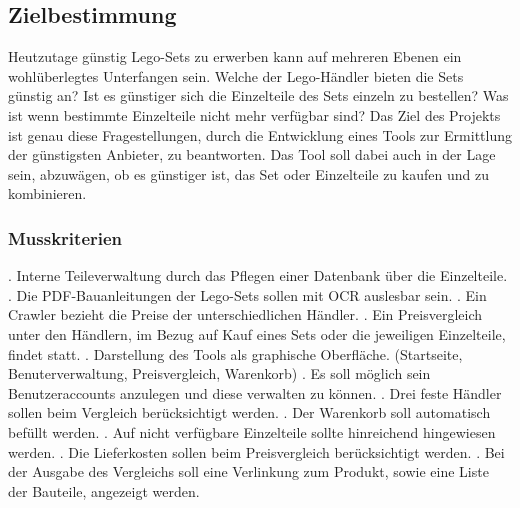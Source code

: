 \subsection{Zielbestimmung}

Heutzutage günstig Lego-Sets zu erwerben kann auf mehreren Ebenen ein wohlüberlegtes Unterfangen sein. Welche der Lego-Händler bieten die Sets günstig an? Ist es günstiger sich die Einzelteile des Sets einzeln zu bestellen? Was ist wenn bestimmte Einzelteile nicht mehr verfügbar sind? \newline
Das Ziel des Projekts ist genau diese Fragestellungen, durch die Entwicklung eines Tools zur Ermittlung der günstigsten Anbieter, zu beantworten. Das Tool soll dabei auch in der Lage sein, abzuwägen, ob es günstiger ist, das Set oder Einzelteile zu kaufen und zu kombinieren.

\subsubsection{Musskriterien}
 . Interne Teileverwaltung durch das Pflegen einer Datenbank über die Einzelteile. \newline 
{} . Die PDF-Bauanleitungen der Lego-Sets sollen mit OCR auslesbar sein. \newline
{} . Ein Crawler bezieht die Preise der unterschiedlichen Händler. \newline
{} . Ein Preisvergleich unter den Händlern, im Bezug auf Kauf eines Sets oder die jeweiligen Einzelteile, findet statt. \newline
{} . Darstellung des Tools als graphische Oberfläche. (Startseite, Benuterverwaltung, Preisvergleich, Warenkorb) \newline
{} . Es soll möglich sein Benutzeraccounts anzulegen und diese verwalten zu können. \newline
{} . Drei feste Händler sollen beim Vergleich berücksichtigt werden. \newline
{} . Der Warenkorb soll automatisch befüllt werden. \newline
{} . Auf nicht verfügbare Einzelteile sollte hinreichend hingewiesen werden. \newline
{} . Die Lieferkosten sollen beim Preisvergleich berücksichtigt werden. \newline 
{} . Bei der Ausgabe des Vergleichs soll eine Verlinkung zum Produkt, sowie eine Liste der Bauteile, angezeigt werden. \newline

